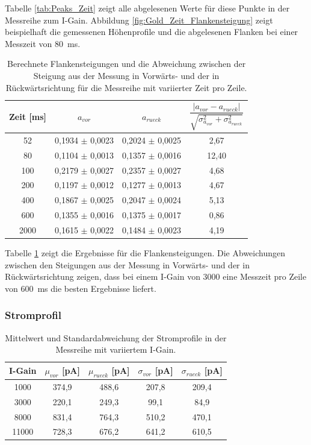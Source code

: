 \documentclass[12pt,a4paper]{article}
\begin{document}
Tabelle \ref{tab:Peaks_Zeit} zeigt alle abgelesenen Werte für diese Punkte in der Messreihe zum I-Gain. Abbildung \ref{fig:Gold_Zeit_Flankensteigung} zeigt beispielhaft die gemessenen Höhenprofile und die abgelesenen Flanken bei einer Messzeit von \SI{80}{ms}.

\begin{table}
\centering
\begin{tabular}{|c|c|c|c|}
\hline 
Zeit [ms] & $a_{vor}$ & $a_{rueck}$ & $\dfrac{|a_{vor} - a_{rueck}|}{\sqrt{\sigma _{a_{vor}}^2 + \sigma _{a_{rueck}}^2}}$ \\ 
\hline 
52 & 0,1934 $\pm$ 0,0023 & 0,2024 $\pm$ 0,0025 & 2,67 \\
\hline 
80 & 0,1104 $\pm$ 0,0013 & 0,1357 $\pm$ 0,0016 & 12,40 \\ 
\hline 
100 & 0,2179 $\pm$ 0,0027 & 0,2357 $\pm$ 0,0027 & 4,68 \\
\hline 
200 & 0,1197 $\pm$ 0,0012 & 0,1277 $\pm$ 0,0013 & 4,67 \\
\hline 
400 & 0,1867 $\pm$ 0,0025 & 0,2047 $\pm$ 0,0024 & 5,13 \\
\hline 
600 & 0,1355 $\pm$ 0,0016 & 0,1375 $\pm$ 0,0017 & 0,86 \\
\hline 
2000 & 0,1615 $\pm$ 0,0022 & 0,1484 $\pm$ 0,0023 & 4,19 \\
\hline 
\end{tabular} 
\caption{Berechnete Flankensteigungen und die Abweichung zwischen der Steigung aus der Messung in Vorwärts- und der in Rückwärtsrichtung für die Messreihe mit variierter Zeit pro Zeile.}
\label{tab:Steigungen_Zeit}
\end{table}

Tabelle \ref{tab:Steigungen_Zeit} zeigt die Ergebnisse für die Flankensteigungen. Die Abweichungen zwischen den Steigungen aus der Messung in Vorwärts- und der in Rückwärtsrichtung zeigen, dass bei einem I-Gain von 3000 eine Messzeit pro Zeile von \SI{600}{ms} die besten Ergebnisse liefert.

\subsubsection{Stromprofil}

\begin{table}
\centering
\begin{tabular}{|c|c|c|c|c|}
\hline 
I-Gain & $\mu_{vor}$ [pA] & $\mu_{rueck}$ [pA] & $\sigma_{vor}$ [pA] & $\sigma_{rueck}$ [pA] \\ 
\hline 
1000 & 374,9 & 488,6 & 207,8 & 209,4 \\
\hline 
3000 & 220,1 & 249,3 & 99,1 & 84,9 \\ 
\hline 
8000 & 831,4 & 764,3 & 510,2 & 470,1 \\
\hline 
11000 & 728,3 & 676,2 & 641,2 & 610,5 \\
\hline 
\end{tabular} 
\caption{Mittelwert und Standardabweichung der Stromprofile in der Messreihe mit variiertem I-Gain.}
\label{tab:Strom_IGain}
\end{table}
\end{document}
